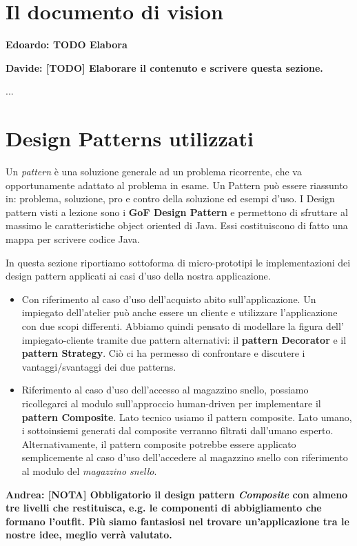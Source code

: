 \documentclass[12pt]{article}
\newcommand{\edoardo}[1]{{\bf \color{red} Edoardo: #1 }}
\newcommand{\andrea}[1]{{\bf \color{mauve} Andrea: #1 }}
\newcommand{\davide}[1]{{\bf \color{chromeyellow} Davide: #1 }}
\begin{document}
\section{Il documento di vision}

\edoardo{\textbf{TODO} Elabora}

\davide{\textbf{[TODO]} Elaborare il contenuto e scrivere questa sezione.}

...


\section{Design Patterns utilizzati}

Un {\em pattern} è una soluzione generale ad un problema ricorrente, che va opportunamente adattato al problema in esame. Un Pattern può essere riassunto in: problema, soluzione, pro e contro della soluzione ed esempi d’uso. I Design pattern visti a lezione sono i \textbf{GoF Design Pattern} e permettono di sfruttare al massimo le caratteristiche object oriented di Java. Essi costituiscono di fatto una mappa per scrivere codice Java.

In questa sezione riportiamo sottoforma di micro-prototipi le implementazioni dei design pattern applicati ai casi d'uso della nostra applicazione.

\begin{itemize}
    \item Con riferimento al caso d'uso dell'acquisto abito sull'applicazione. Un impiegato dell'atelier può anche essere un cliente e utilizzare l'applicazione con due scopi differenti.
    Abbiamo quindi pensato di modellare la figura dell' impiegato-cliente tramite due pattern alternativi: il \textbf{pattern Decorator} e il \textbf{pattern Strategy}. Ciò ci ha permesso di confrontare e discutere i vantaggi/svantaggi dei due patterns.
    \item Riferimento al caso d'uso dell'accesso al magazzino snello, possiamo ricollegarci al modulo sull'approccio human-driven per implementare il \textbf{pattern Composite}. Lato tecnico usiamo il pattern composite. Lato umano, i sottoinsiemi generati dal composite verranno filtrati dall'umano esperto.
    Alternativamente, il pattern composite potrebbe essere applicato semplicemente al caso d'uso dell'accedere al magazzino snello con riferimento al modulo del {\em magazzino snello}.
\end{itemize}


\andrea{\textbf{[NOTA]} Obbligatorio il design pattern {\em Composite} con almeno tre livelli che restituisca, e.g. le componenti di abbigliamento che formano l'outfit. Più siamo fantasiosi nel trovare un'applicazione tra le nostre idee, meglio verrà valutato.}
\end{document}

